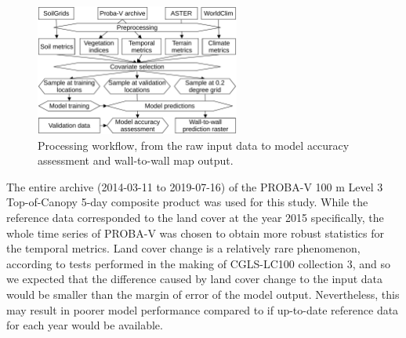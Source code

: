 \documentclass[review,authoryear,3p]{elsarticle}
\begin{document}
\begin{figure}
 \centering
 \includegraphics[width=0.6\textwidth]{article-figures/flowcharts/2020-07-10-flowchart}
 \caption{Processing workflow, from the raw input data to model accuracy assessment and wall-to-wall map output.}
 \label{fig-processing}
\end{figure}


\label{sec-temporal-filter}

The entire archive (2014-03-11 to 2019-07-16) of the PROBA-V 100 m Level 3 Top-of-Canopy 5-day composite product \citep{dierckx2014probav,probavguide2} was used for this study.
While the reference data corresponded to the land cover at the year 2015 specifically, the whole time series of PROBA-V was chosen to obtain more robust statistics for the temporal metrics.
Land cover change is a relatively rare phenomenon, according to tests performed in the making of \gls{CGLS-LC100} collection 3, and so we expected that the difference caused by land cover change to the input data would be smaller than the margin of error of the model output.
Nevertheless, this may result in poorer model performance compared to if up-to-date reference data for each year would be available.
\end{document}
